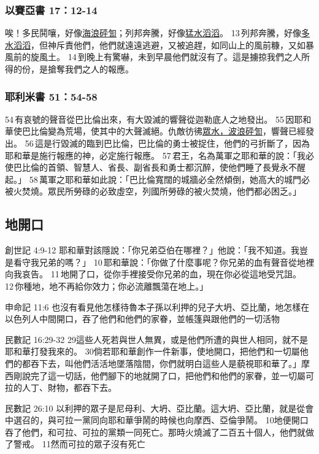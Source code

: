\subsubsection{以賽亞書 17：12-14}
唉！多民鬨嚷，好像\underline{海浪砰訇}；列邦奔騰，好像\underline{猛水滔滔}。 13 列邦奔騰，好像\underline{多水滔滔}，但神斥責他們，他們就遠遠逃避，又被追趕，如同山上的風前糠，又如暴風前的旋風土。 14 到晚上有驚嚇，未到早晨他們就沒有了。這是擄掠我們之人所得的份，是搶奪我們之人的報應。

\subsubsection{耶利米書 51：54-58}
54 有哀號的聲音從巴比倫出來，有大毀滅的響聲從迦勒底人之地發出。 55 因耶和華使巴比倫變為荒場，使其中的大聲滅絕。仇敵彷彿\underline{眾水，波浪砰訇}，響聲已經發出。 56 這是行毀滅的臨到巴比倫，巴比倫的勇士被捉住，他們的弓折斷了，因為耶和華是施行報應的神，必定施行報應。 57 君王，名為萬軍之耶和華的說：「我必使巴比倫的首領、智慧人、省長、副省長和勇士都沉醉，使他們睡了長覺永不醒起。」 58 萬軍之耶和華如此說：「巴比倫寬闊的城牆必全然傾倒，她高大的城門必被火焚燒。眾民所勞碌的必致虛空，列國所勞碌的被火焚燒，他們都必困乏。」






\subsection{地開口}
創世記 4:9-12
耶和華對該隱說：「你兄弟亞伯在哪裡？」他說：「我不知道。我豈是看守我兄弟的嗎？」 10 耶和華說：「你做了什麼事呢？你兄弟的血有聲音從地裡向我哀告。 11 地開了口，從你手裡接受你兄弟的血，現在你必從這地受咒詛。 12 你種地，地不再給你效力；你必流離飄蕩在地上。」

申命記 11:6
也沒有看見他怎樣待魯本子孫以利押的兒子大坍、亞比蘭，地怎樣在以色列人中間開口，吞了他們和他們的家眷，並帳篷與跟他們的一切活物

民數記 16:29-32
29這些人死若與世人無異，或是他們所遭的與世人相同，就不是耶和華打發我來的。 30倘若耶和華創作一件新事，使地開口，把他們和一切屬他們的都吞下去，叫他們活活地墜落陰間，你們就明白這些人是藐視耶和華了。」摩西剛說完了這一切話，他們腳下的地就開了口，把他們和他們的家眷，並一切屬可拉的人丁、財物，都吞下去。

民數記 26:10
以利押的眾子是尼母利、大坍、亞比蘭。這大坍、亞比蘭，就是從會中選召的，與可拉一黨同向耶和華爭鬧的時候也向摩西、亞倫爭鬧。 10地便開口吞了他們，和可拉、可拉的黨類一同死亡。那時火燒滅了二百五十個人，他們就做了警戒。 11然而可拉的眾子沒有死亡

